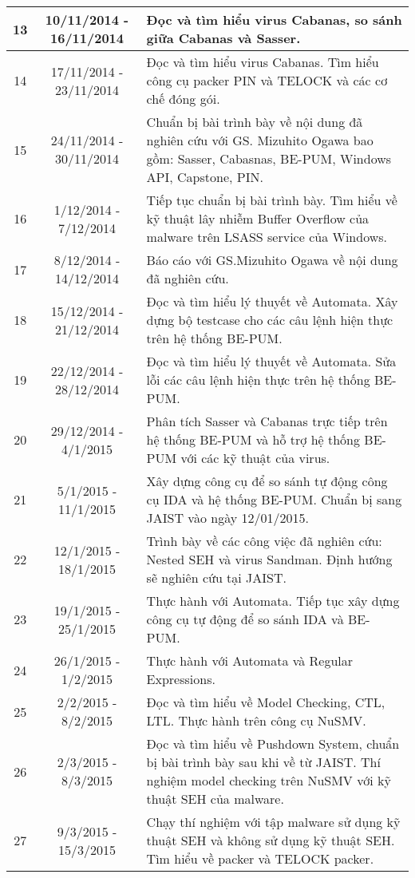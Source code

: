 \begin{center}
\begin{longtable}{|c|c|p{8cm}|}
\hline
13					& 10/11/2014 - 16/11/2014		& Đọc và tìm hiểu virus Cabanas, so sánh giữa Cabanas và Sasser.\\	
\hline
14					& 17/11/2014 - 23/11/2014		& Đọc và tìm hiểu virus Cabanas. Tìm hiểu công cụ packer PIN và TELOCK và các cơ chế đóng gói.\\	
\hline
15					& 24/11/2014 - 30/11/2014		& Chuẩn bị bài trình bày về nội dung đã nghiên cứu với GS. Mizuhito Ogawa bao gồm: Sasser, Cabasnas, BE-PUM, Windows API, Capstone, PIN.\\	
\hline
16					& 1/12/2014 - 7/12/2014			& Tiếp tục chuẩn bị bài trình bày. Tìm hiểu về kỹ thuật lây nhiễm Buffer Overflow của malware trên LSASS service của Windows.\\	
\hline
17					& 8/12/2014 - 14/12/2014		& Báo cáo với GS.Mizuhito Ogawa về nội dung đã nghiên cứu.\\	
\hline
18					& 15/12/2014 - 21/12/2014		& Đọc và tìm hiểu lý thuyết về Automata. Xây dựng bộ testcase cho các câu lệnh hiện thực trên hệ thống BE-PUM.\\	
\hline
19					& 22/12/2014 - 28/12/2014		& Đọc và tìm hiểu lý thuyết về Automata. Sửa lỗi các câu lệnh hiện thực trên hệ thống BE-PUM.\\	
\hline
20					& 29/12/2014 - 4/1/2015			& Phân tích Sasser và Cabanas trực tiếp trên hệ thống BE-PUM và hỗ trợ hệ thống BE-PUM với các kỹ thuật của virus.\\	
\hline
21					& 5/1/2015 - 11/1/2015			& Xây dựng công cụ để so sánh tự động công cụ IDA và hệ thống BE-PUM. Chuẩn bị sang JAIST vào ngày 12/01/2015.\\	
\hline
22					& 12/1/2015 - 18/1/2015			& Trình bày về các công việc đã nghiên cứu: Nested SEH và virus Sandman. Định hướng sẽ nghiên cứu tại JAIST.\\	
\hline
23					& 19/1/2015 - 25/1/2015			& Thực hành với Automata. Tiếp tục xây dựng công cụ tự động để so sánh IDA và BE-PUM.\\	
\hline
24					& 26/1/2015 - 1/2/2015			& Thực hành với Automata và Regular Expressions.\\
\hline
25					& 2/2/2015 - 8/2/2015			& Đọc và tìm hiểu về Model Checking, CTL, LTL. Thực hành trên công cụ NuSMV.\\
\hline
26					& 2/3/2015 - 8/3/2015			& Đọc và tìm hiểu về Pushdown System, chuẩn bị bài trình bày sau khi về từ JAIST. Thí nghiệm model checking trên NuSMV với kỹ thuật SEH của malware.\\
\hline
27					& 9/3/2015 - 15/3/2015			& Chạy thí nghiệm với tập malware sử dụng kỹ thuật SEH và không sử dụng kỹ thuật SEH. Tìm hiểu về packer và TELOCK packer.\\

\end{longtable}
\end{center}

